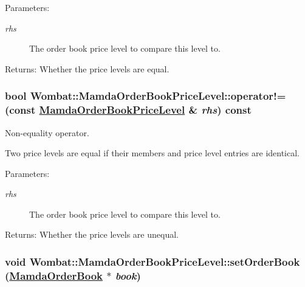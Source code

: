 \begin{Desc}
\item[Parameters:]
\begin{description}
\item[{\em rhs}]The order book price level to compare this level to.\end{description}
\end{Desc}
\begin{Desc}
\item[Returns:]Whether the price levels are equal. \end{Desc}
\hypertarget{classWombat_1_1MamdaOrderBookPriceLevel_d315992c34dd1ffd704186fe8b2c8bb2}{
\subsubsection[operator"!=]{\setlength{\rightskip}{0pt plus 5cm}bool Wombat::Mamda\-Order\-Book\-Price\-Level::operator!= (const \hyperlink{classWombat_1_1MamdaOrderBookPriceLevel}{Mamda\-Order\-Book\-Price\-Level} \& {\em rhs}) const}}
\label{classWombat_1_1MamdaOrderBookPriceLevel_d315992c34dd1ffd704186fe8b2c8bb2}


Non-equality operator. 

Two price levels are equal if their members and price level entries are identical.

\begin{Desc}
\item[Parameters:]
\begin{description}
\item[{\em rhs}]The order book price level to compare this level to.\end{description}
\end{Desc}
\begin{Desc}
\item[Returns:]Whether the price levels are unequal. \end{Desc}
\hypertarget{classWombat_1_1MamdaOrderBookPriceLevel_c70687d7df55a6fff9d09d685ff3762e}{
\subsubsection[setOrderBook]{\setlength{\rightskip}{0pt plus 5cm}void Wombat::Mamda\-Order\-Book\-Price\-Level::set\-Order\-Book (\hyperlink{classWombat_1_1MamdaOrderBook}{Mamda\-Order\-Book} $\ast$ {\em book})}}
\label{classWombat_1_1MamdaOrderBookPriceLevel_c70687d7df55a6fff9d09d685ff3762e}


